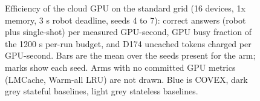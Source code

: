 \documentclass[sigconf]{acmart}
\begin{document}
{\selectfont
\begin{figure}[t]
  \centering
  
  \caption{Efficiency of the cloud GPU on the standard grid (16 devices, 1x memory, 3 s robot deadline, seeds 4 to 7): correct answers (robot plus single-shot) per measured GPU-second, GPU busy fraction of the 1200 s per-run budget, and D174 uncached tokens charged per GPU-second. Bars are the mean over the seeds present for the arm; marks show each seed. Arms with no committed GPU metrics (LMCache, Warm-all LRU) are not drawn. Blue is COVEX, dark grey stateful baselines, light grey stateless baselines.}
  \label{fig:F13_gpu_efficiency}
\end{figure}
}


\end{document}
